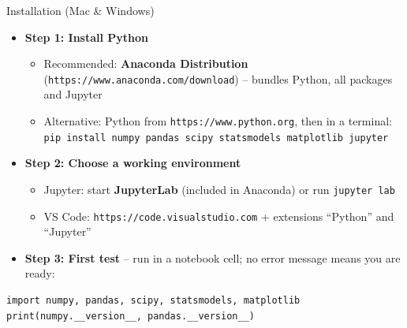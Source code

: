 \documentclass[aspectratio=169,11pt]{beamer}
\begin{document}
\begin{frame}[fragile]{Installation (Mac \& Windows)}
\small
\begin{itemize}
    \item \textbf{Step 1: Install Python}
    \begin{itemize}
        \item Recommended: \textbf{Anaconda Distribution}
              (\texttt{https://www.anaconda.com/download}) --
              bundles Python, all packages and Jupyter
        \item Alternative: Python from \texttt{https://www.python.org}, then in a terminal:\\
              \texttt{\footnotesize pip install numpy pandas scipy statsmodels matplotlib jupyter}
    \end{itemize}

    \vspace{0.2cm}

    \item \textbf{Step 2: Choose a working environment}
    \begin{itemize}
        \item Jupyter: start \textbf{JupyterLab} (included in Anaconda) or run \texttt{jupyter lab}
        \item VS Code: \texttt{https://code.visualstudio.com} + extensions
              ``Python'' and ``Jupyter''
    \end{itemize}

    \vspace{0.2cm}

    \item \textbf{Step 3: First test} -- run in a notebook cell; no error message means you are ready:
\end{itemize}
\vspace{-0.2cm}
\begin{lstlisting}[xleftmargin=2.2em]
import numpy, pandas, scipy, statsmodels, matplotlib
print(numpy.__version__, pandas.__version__)
\end{lstlisting}
\end{frame}
\end{document}
